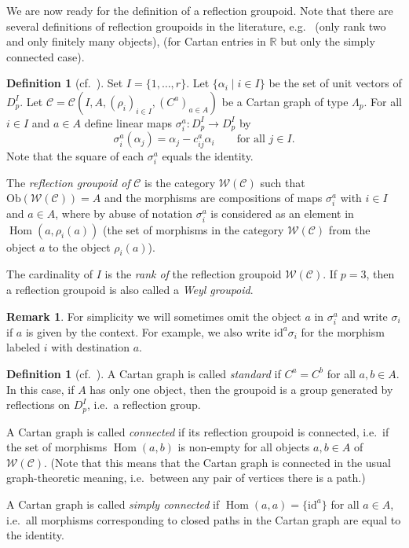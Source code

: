 \documentclass[11pt,a4paper]{amsart}
\theoremstyle{definition}
\newtheorem{Definition}[Lemma]{Definition}
\newtheorem{Remark}[Lemma]{Remark}
\numberwithin{equation}{section}
\newcommand{\id }{\mathrm{id}}
\DeclareMathOperator{\Hom}{Hom}
\newcommand{\rfl }{\rho }
\newcommand{\Cm }{C}
\newcommand{\Cc }{\mathcal{C}}
\newcommand{\cm }{c}
\newcommand{\s }{\sigma }
\newcommand{\Wg }{\mathcal{W}}
\newcommand{\Ob }{\mathrm{Ob}}
\newcommand{\Ri}{D_p}
\begin{document}
\medskip

We are now ready for the definition of a reflection groupoid. Note that there are several definitions of reflection groupoids in the literature, e.g.\ \cite[Def.\ 2.3]{p-CH11} (only rank two and only finitely many objects), \cite[Def.\ 2.10]{p-C21} (for Cartan entries in $\mathbb{R}$ but only the simply connected case).

\begin{Definition}[cf.\ {\cite[Def.\ 2.1]{p-CH09a}}]\label{def:WG}
Set $I=\{1,\ldots,r\}$.
Let $\{\alpha_i\mid i\in I\}$ be the set
of unit vectors of $\Ri^I$.
Let $\Cc = \Cc (I,A,(\rfl _i)_{i \in I}, (\Cm ^a)_{a \in A})$ be a
Cartan graph of type $\Lambda_p$. For all $i \in I$ and $a \in A$ define linear maps
$\s_i^a :\Ri^I\to \Ri^I$ by
$$
\s _i^a (\alpha_j) = \alpha_j - \cm _{ij}^a \alpha_i \qquad
\text{for all } j \in I.
\label{fwg_eq:sia}
$$
Note that the square of each $\sigma_i^a$ equals the identity.

\medskip

The \emph{reflection groupoid of} $\Cc $
is the category $\Wg (\Cc )$ such that $\Ob (\Wg (\Cc ))=A$ and
the morphisms are compositions of maps
$\s_i^a$ with $i\in I$ and $a\in A$,
where by abuse of notation $\s_i^a$ is considered as an element in $\Hom (a,\rfl_i(a))$ (the set of morphisms 
in the category $\Wg (\Cc )$ from the object
$a$ to the object $\rfl_i(a)$).


The cardinality of $I$ is the \emph{rank of}
the reflection groupoid $\Wg (\Cc )$.
If $p=3$, then a reflection groupoid is also called a \emph{Weyl groupoid}.
\end{Definition}

\begin{Remark}
For simplicity we will sometimes omit the object $a$ in $\s_i^a$ and write $\s_i$ if $a$ is given by the context. For example, we also write $\id ^a \s _i$
 for the morphism labeled $i$ with destination $a$.
\end{Remark}

\begin{Definition}[cf.\ {\cite[Def.\ 2.1]{p-CH09a}}]
\label{def:simplyconnected}
A Cartan graph is called \emph{standard} if $C^a = C^b$ for all $a,b \in A$.
In this case, if $A$ has only one object, then the groupoid is a group generated by reflections on $\Ri^I$, i.e.\ a reflection group.

A Cartan graph is called \emph{connected} if its reflection groupoid is connected, i.e.\ if the set of morphisms $\Hom (a,b)$ is non-empty for all objects $a,b\in A$ of $\Wg(\Cc)$. (Note that this means that
the Cartan graph is connected in the 
usual graph-theoretic meaning, i.e.\ between any pair of vertices there is 
a path.)

A Cartan graph is called \emph{simply connected} if $\Hom (a,a)=\{\id ^a\}$ for all $a\in A$, i.e.\ all morphisms corresponding to closed 
paths in the Cartan graph are equal to the identity.
\end{Definition}
\end{document}
